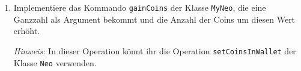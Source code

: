 \begin{enumerate}[label=\alph*)]
            Es kann vorkommen, dass wir den Kommandos oder Abfragen, die wir ausführen, zusätzliche Informationen mitgeben wollen. Hierzu können wir Werte an Operationen übergeben, die \emph{Argmente} heißen. Diese schreiben wir in die Klammern hinter dem Operationsnamen. Eine \footnote{zugegebenermaßen nicht allzu sinnvolle} Operation, die zwei Zahlen addiert, würde zum Beispiel so aussehen:
        \begin{lstlisting}
    public int add(final int a, final int b) {
        return a + b;
    }
        \end{lstlisting}
        Das \lstinline{final} hierbei bedeutet, dass wir den Wert des Arguments in der Operation nicht verändern können.
    
        \item Implementiere das Kommando \lstinline{gainCoins} der Klasse \lstinline{MyNeo}, die eine Ganzzahl als Argument bekommt und die Anzahl der Coins um diesen Wert erhöht.
    
        \emph{Hinweis:} In dieser Operation könnt ihr die Operation \lstinline{setCoinsInWallet} der Klasse \lstinline{Neo} verwenden.\par
    \end{enumerate}
